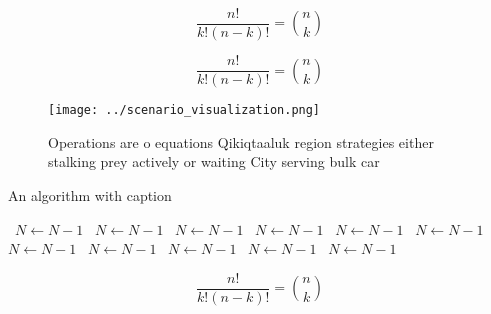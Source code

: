 \documentclass[a4paper]{article}
\begin{document}
\[ \frac{n!}{k!(n-k)!} = \binom{n}{k} \]

\[ \frac{n!}{k!(n-k)!} = \binom{n}{k} \]

\begin{figure}
\centering
\texttt{[image: ../scenario\_visualization.png]}
\caption{Operations are o equations Qikiqtaaluk region strategies either stalking prey actively or waiting City serving bulk car
}
\end{figure}
 
\begin{algorithm}
\caption{An algorithm with caption}
\begin{algorithmic}
\    \State $N \gets N - 1$
\    \State $N \gets N - 1$
\    \State $N \gets N - 1$
\    \State $N \gets N - 1$
\    \State $N \gets N - 1$
\    \State $N \gets N - 1$
\    \State $N \gets N - 1$
\    \State $N \gets N - 1$
\    \State $N \gets N - 1$
\    \State $N \gets N - 1$
\    \State $N \gets N - 1$
\EndWhile
\end{algorithmic}
\end{algorithm}

\[ \frac{n!}{k!(n-k)!} = \binom{n}{k} \]
\end{document}
